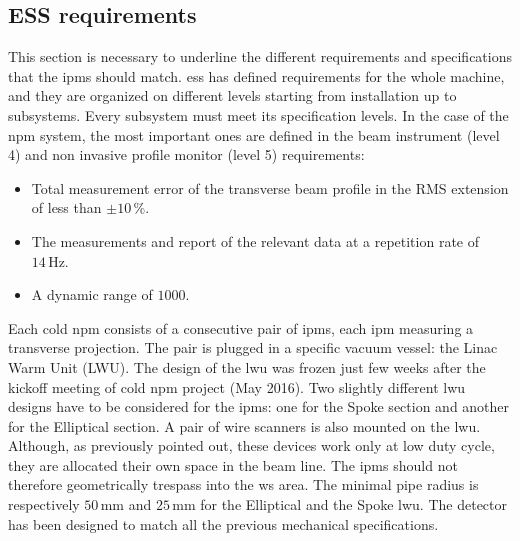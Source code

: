 \begin{refsection}
  \section{ESS requirements}
  This section is necessary to underline the different requirements and specifications that the \acrshort{ipm}s should match. \acrshort{ess} has defined requirements for the whole machine, and they are organized on different levels starting from installation up to subsystems. Every subsystem must meet its specification levels. In the case of the \acrshort{npm} system, the most important ones are defined in the beam instrument (level 4) and non invasive profile monitor (level 5) requirements:
  \begin{itemize}
    \item Total measurement error of the transverse beam profile in the RMS extension of less than $\pm10\,\%$.
    \item The measurements and report of the relevant data at a repetition rate of \(14\,\mathrm{Hz}\).
    \item A dynamic range of $1000$.
  \end{itemize}

  Each cold \acrshort{npm} consists of a consecutive pair of \acrshort{ipm}s, each \acrshort{ipm} measuring a transverse projection. The pair is plugged in a specific vacuum vessel: the Linac Warm Unit (LWU). The design of the \acrshort{lwu} was frozen just few weeks after the kickoff meeting of cold \acrshort{npm} project (May 2016). Two slightly different \acrshort{lwu} designs have to be considered for the \acrshort{ipm}s: one for the Spoke section and another for the Elliptical section. A pair of wire scanners is also mounted on the \acrshort{lwu}. Although, as previously pointed out, these devices work only at low duty cycle, they are allocated their own space in the beam line. The \acrshort{ipm}s should not therefore geometrically trespass into the \acrshort{ws} area. The minimal pipe radius is respectively \(50\,\mathrm{mm}\) and \(25\,\mathrm{mm}\) for the Elliptical and the Spoke \acrshort{lwu}. The detector has been designed to match all the previous mechanical specifications.

  


\end{refsection}
